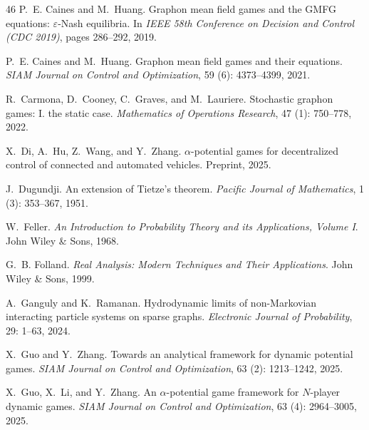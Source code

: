 \documentclass[11pt]{article}
\numberwithin{equation}{section}
\begin{document}
\begin{thebibliography}{46}
P.~E. Caines and M.~Huang.
\newblock Graphon mean field games and the {GMFG} equations:
  $\varepsilon$-{N}ash equilibria.
\newblock In \emph{IEEE 58th Conference on Decision and Control (CDC 2019)},
  pages 286--292, 2019.

P.~E. Caines and M.~Huang.
\newblock Graphon mean field games and their equations.
\newblock \emph{SIAM Journal on Control and Optimization}, 59
  (6): 4373--4399, 2021.

R.~Carmona, D.~Cooney, C.~Graves, and M.~Lauriere.
\newblock Stochastic graphon games: I. the static case.
\newblock \emph{Mathematics of Operations Research}, 47 (1):
  750--778, 2022.

X.~Di, A.~Hu, Z.~Wang, and Y.~Zhang.
\newblock $\alpha$-potential games for decentralized control of connected and
  automated vehicles.
\newblock Preprint, 2025.

J.~Dugundji.
\newblock An extension of {T}ietze’s theorem.
\newblock \emph{Pacific Journal of Mathematics}, 1 (3):
  353--367, 1951.

W.~Feller.
\newblock \emph{An Introduction to Probability Theory and its Applications,
  Volume I}.
\newblock John Wiley \& Sons, 1968.

G.~B. Folland.
\newblock \emph{Real Analysis: Modern Techniques and Their Applications}.
\newblock John Wiley \& Sons, 1999.

A.~Ganguly and K.~Ramanan.
\newblock Hydrodynamic limits of non-{M}arkovian interacting particle systems
  on sparse graphs.
\newblock \emph{Electronic Journal of Probability}, 29: 1--63, 2024.

X.~Guo and Y.~Zhang.
\newblock Towards an analytical framework for dynamic potential games.
\newblock \emph{SIAM Journal on Control and Optimization}, 63
  (2): 1213--1242, 2025.

X.~Guo, X.~Li, and Y.~Zhang.
\newblock An $\alpha$-potential game framework for {$N$}-player dynamic games.
\newblock \emph{SIAM Journal on Control and Optimization}, 63
  (4): 2964--3005, 2025{}.


\end{thebibliography}
\end{document}
